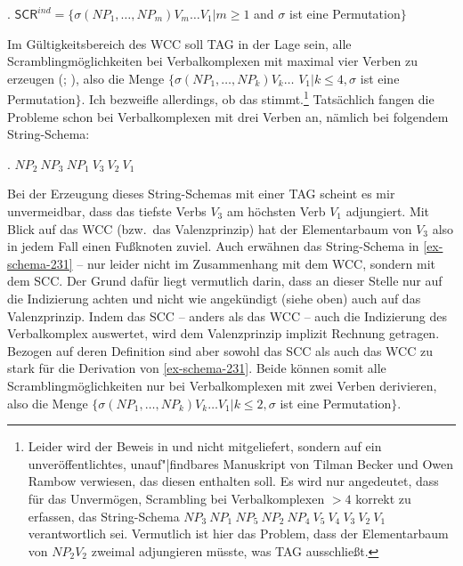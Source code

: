 \ex. $\mathsf{SCR}^{ind} = \{ \sigma(\mathit{NP}_1,\ldots,\mathit{NP}_m) V_m \ldots V_1 | m \geq 1$ and $\sigma$ ist eine Permuta\-tion$\}$ 

Im Gültigkeitsbereich des WCC soll TAG in der Lage sein, alle Scramblingmöglichkeiten bei Verbalkomplexen mit maximal vier Verben zu erzeugen (\citealt[23]{Becker:Joshi:Rambow:91}; \citealt[177]{Joshi:Becker:Rambow:00}), also die Menge $\{ \sigma(\mathit{NP}_1, \ldots, \mathit{NP}_k) V_k \ldots$ $V_1 | k \leq 4, \sigma$ ist eine Permuta\-tion$\}$. Ich bezweifle allerdings, ob das stimmt.\footnote{Leider wird der Beweis in \citet{Becker:Joshi:Rambow:91} und \citet{Joshi:Becker:Rambow:00} nicht mitgeliefert, sondern auf ein unveröffentlichtes, unauf"|findbares Manuskript von Tilman Becker und Owen Rambow verwiesen, das diesen enthalten soll. Es wird nur angedeutet, dass für das Unvermögen, Scrambling bei Verbalkomplexen $> 4$ korrekt zu erfassen, das String-Schema $\mathit{NP}_3 ~ \mathit{NP}_1 ~ \mathit{NP}_5 ~ \mathit{NP}_2 ~ \mathit{NP}_4 ~ V_5 ~ V_4 ~ V_3 ~ V_2 ~ V_1$ verantwortlich sei.  Vermutlich ist hier das Problem, dass der Elementarbaum von $\mathit{NP}_2 V_2$ zweimal adjungieren müsste, was TAG ausschlie\ss t.} Tatsächlich fangen die Probleme schon bei Verbalkomplexen mit drei Verben an, nämlich bei folgendem String-Schema:

\ex. $\mathit{NP}_2 ~ \mathit{NP}_3 ~ \mathit{NP}_1 ~ V_3 ~ V_2 ~ V_1$\label{ex-schema-231} 

Bei der Erzeugung dieses String-Schemas mit einer TAG scheint es mir unvermeidbar, dass das tiefste Verbs $V_3$ am höchsten Verb $V_1$ adjungiert. Mit Blick auf das WCC (bzw.\ das Valenzprinzip) hat der Elementarbaum von $V_3$ also in jedem Fall einen Fu\ss knoten zuviel. Auch \citet[(6)]{Joshi:Becker:Rambow:00} erwähnen das String-Schema in \ref{ex-schema-231} -- nur leider nicht im Zusammenhang mit dem WCC, sondern mit dem SCC. Der Grund dafür liegt vermutlich darin, dass \cite{Joshi:Becker:Rambow:00} an dieser Stelle nur auf die Indizierung achten und nicht wie angekündigt (siehe oben) auch auf das Valenzprinzip. Indem das SCC -- anders als das WCC -- auch die Indizierung des Verbalkomplex auswertet, wird dem Valenzprinzip implizit Rechnung getragen. Bezogen auf deren Definition sind aber sowohl das SCC als auch das WCC zu stark für die Derivation von \ref{ex-schema-231}. Beide können somit alle Scramblingmöglichkeiten nur bei Verbalkomplexen mit zwei Verben derivieren, also die Menge $\{ \sigma(\mathit{NP}_1,\ldots,\mathit{NP}_k) V_k \ldots V_1 | k \leq 2, \sigma$ ist eine Permuta\-tion$\}$.

